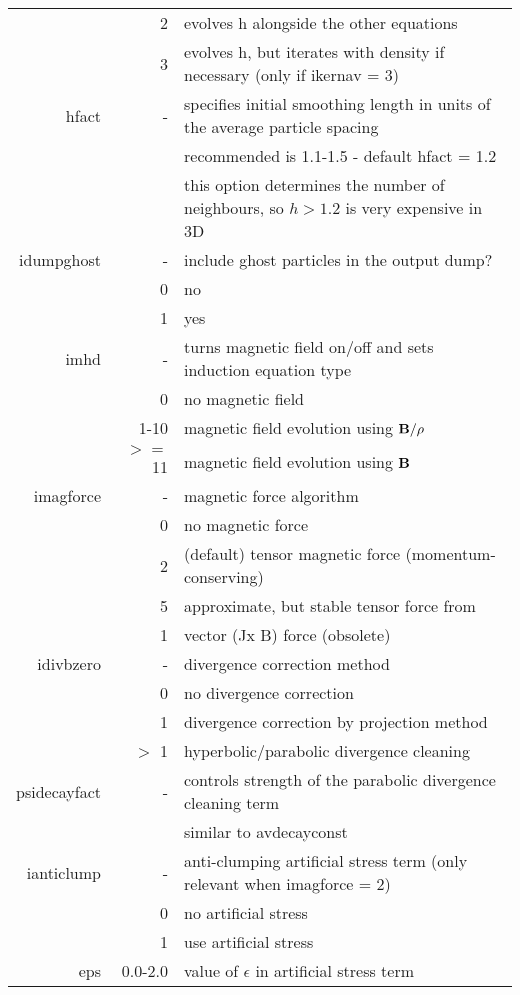 \documentclass[a4paper,12pt]{article}
\begin{document}
\begin{table}[!h]
\begin{tabular}{rrp{}}
	& 2 & evolves h alongside the other equations \\
	& 3 & evolves h, but iterates with density if necessary (only if
	ikernav = 3) \\
hfact   & - & specifies initial smoothing length in units of the average particle spacing \\
        & & recommended is 1.1-1.5 - default hfact = 1.2  \\
	& & this option determines the number of neighbours, so $h>1.2$ is very expensive in 3D \\
idumpghost & - & include ghost particles in the output dump? \\
         & 0 & no \\
	 & 1 & yes \\
imhd     & - & turns magnetic field on/off and sets induction equation type \\
         & 0 & no magnetic field \\
	 & 1-10 & magnetic field evolution using ${\bf B}/\rho$ \\
	 & $>=$ 11 & magnetic field evolution using ${\bf B}$ \\
imagforce & - & magnetic force algorithm \\
          & 0 & no magnetic force \\
	  & 2 & (default) tensor magnetic force (momentum-conserving) \\
	  & 5 & approximate, but stable tensor force from \citet{morrisphd} \\
	  & 1 & vector (Jx B) force (obsolete) \\
idivbzero & - & divergence correction method \\
          & 0 & no divergence correction \\
	  & 1 & divergence correction by projection method \\
	  & $>$ 1 & hyperbolic/parabolic divergence cleaning \\
psidecayfact & - & controls strength of the parabolic divergence cleaning term \\
          & & similar to avdecayconst \\
ianticlump & - & anti-clumping artificial stress term (only relevant when imagforce = 2) \\
          & 0 & no artificial stress \\
	  & 1 & use artificial stress \\
eps       & 0.0-2.0 & value of $\epsilon$ in artificial stress term \\

\end{tabular}
\end{table}
\end{document}
